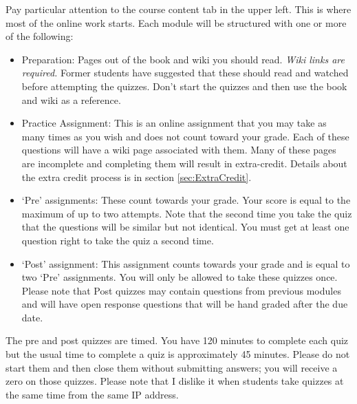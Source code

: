 \documentclass[letterpaper,10pt]{article}
\begin{document}
Pay particular attention to the course content tab in the upper
left. This is where most of the online work starts.  Each module will
be structured with one or more of the following:


\begin{itemize}
\item Preparation: Pages out of the book and wiki you should read.
  \emph{Wiki links are required.}  Former students have suggested that these should read and watched before attempting the quizzes.  Don't start the quizzes and then use the book and wiki as a reference.
  
  \item Practice Assignment: This is an online assignment that you may take as many times as you wish and does not count toward your grade. Each of these questions will have a wiki page associated with them. Many of these pages are incomplete and completing them will result in extra-credit. Details about the extra credit process is in section \ref{sec:ExtraCredit}.

\item `Pre' assignments: These count towards your grade.
  Your score is equal to the maximum of up to two attempts. Note that the second time you take the quiz that the questions will be similar but not identical. You must get at least one question right to take the quiz a second time.

\item `Post' assignment: This assignment counts
  towards your grade and is equal to two `Pre' assignments.  You will
  only be allowed to take these quizzes once.  Please note that Post quizzes may contain questions from previous modules and will have open response questions that will be hand graded after the due date.

 
\end{itemize}

 The pre and post quizzes are timed. You have 120 minutes to complete each quiz but the usual time to complete a quiz is approximately 45 minutes.  Please do not start them and
  then close them without submitting answers; you will receive a zero on those quizzes.  Please note that I dislike it when students take
  quizzes at the same time from the same IP address.

\end{document}
